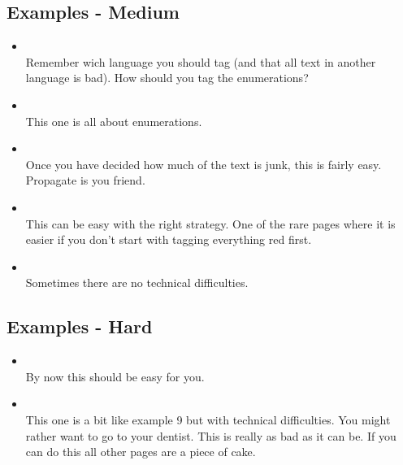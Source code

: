 \documentclass[12pt]{article}
\begin{document}
\subsection{Examples - Medium}
\label{ExMedium}
\begin{itemize}
\item {} \\
Remember wich language you should tag (and that all text in another language is bad). How should you tag the enumerations?

\item {} \\
This one is all about enumerations.

\item {} \\
Once you have decided how much of the text is junk, this is fairly easy. Propagate is you friend.

\item {} \\
This can be easy with the right strategy. One of the rare pages where it is easier if you don't start with tagging everything red first.

\item {} \\
Sometimes there are no technical difficulties.

\end{itemize}

\subsection{Examples - Hard}
\begin{itemize}
% 
\item {}\\
By now this should be easy for you. 

\item {} \\
This one is a bit like example 9 but with technical difficulties. You might rather want to go to your dentist. This is really as bad as it can be. If you can do this all other pages are a piece of cake.

\end{itemize}
\end{document}

